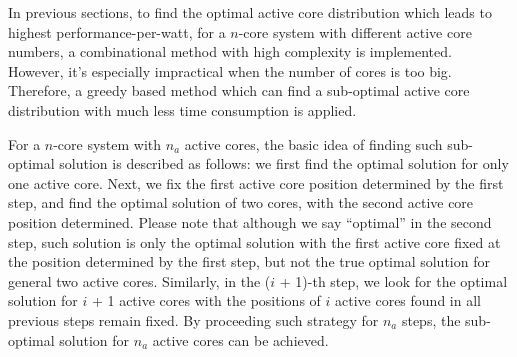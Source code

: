 In previous sections, to find the optimal active core distribution which leads to highest performance-per-watt, for a $n$-core system with different active core numbers,  a combinational method with high complexity is implemented. However, it's  especially impractical when the number of cores is too big. Therefore, a greedy based method which can find a sub-optimal active core distribution with much less time consumption is applied.

For a $n$-core system with $n_{a}$ active cores, the basic idea of finding such sub-optimal solution is described as follows: we first find the optimal solution for only one active core. Next, we fix the first active core position determined by the first step, and find the optimal solution of two cores, with the second active core position determined. Please note that although we say “optimal” in the second step, such solution is only the optimal solution with the first active core fixed at the position determined by the first step, but not the true optimal solution for general two active cores. Similarly, in the ($i$ + 1)-th step, we look for the optimal solution for $i$ + 1 active cores with the positions of $i$ active cores found in all previous steps remain fixed. By proceeding such strategy for $n_{a}$ steps, the sub-optimal solution for $n_{a}$ active cores can be achieved.